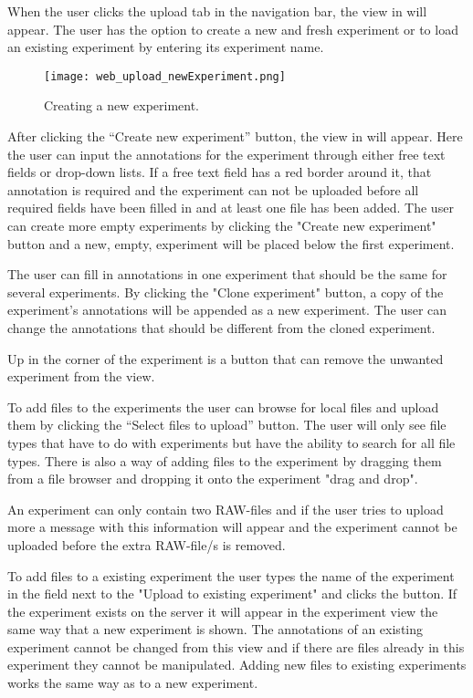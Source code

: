 When the user clicks the upload tab in the navigation bar, the view in  will appear. The user has the option to create a new and fresh experiment or to load an existing experiment by entering its experiment name. 
\begin{sidewaysfigure}[h]
\centering
\texttt{[image: web\_upload\_newExperiment.png]}
\caption{\label{fig:web_upload_newExperiment}Creating a new experiment.}
\end{sidewaysfigure}

After clicking the “Create new experiment” button, the view in  will appear. Here the user can input the annotations for the experiment through either free text fields or drop-down lists. If a free text field has a red border around it, that annotation is required and the experiment can not be uploaded before all required fields have been filled in and at least one file has been added.
The user can create more empty experiments by clicking the "Create new experiment" button and a new, empty, experiment will be placed below the first experiment.

The user can fill in annotations in one experiment that should be the same for several experiments. By clicking the "Clone experiment" button, a copy of the experiment's annotations will be appended as a new experiment. The user can change the annotations that should be different from the cloned experiment.

Up in the corner of the experiment is a button that can remove the unwanted experiment from the view. 

To add files to the experiments the user can browse for local files and upload them by clicking the “Select files to upload” button. The user will only see file types that have to do with experiments but have the ability to search for all file types. There is also a way of adding files to the experiment by dragging them from a file browser and dropping it onto the experiment "drag and drop".

An experiment can only contain two RAW-files and if the user tries to upload more a message with this information will appear and the experiment cannot be uploaded before the extra RAW-file/s is removed. 

To add files to a existing experiment the user types the name of the experiment in the field next to the "Upload to existing experiment" and clicks the button. If the experiment exists on the server it will appear in the experiment view the same way that a new experiment is shown. The annotations of an existing experiment cannot be changed from this view and if there are files already in this experiment they cannot be manipulated. Adding new files to existing experiments works the same way as to a new experiment.

